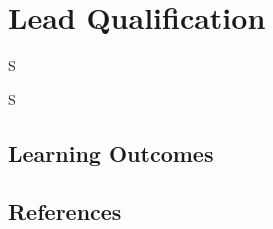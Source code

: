 \frenchspacing
\chapter{Lead Qualification}
\epigraph{S}{S}

%
\section{Learning Outcomes}

%
\section{References}
